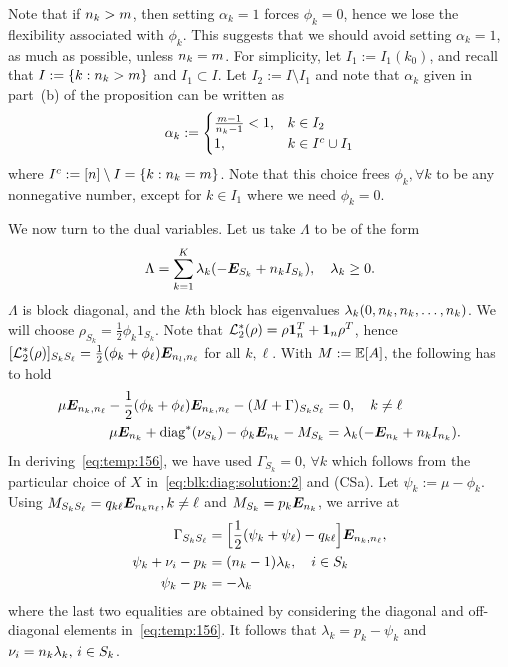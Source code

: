   Note that if $n_k > m$, then setting $\alpha_k = 1$ forces $\phi_k = 0$, hence we lose the flexibility associated with $\phi_k$. This suggests that we should avoid setting $\alpha_k = 1$, as much as possible, unless $n_k = m$. For simplicity, let $I_1 := I_1(k_0)$, and recall that $I := \{ k: n_k > m\}$ and $I_1 \subset I$. Let $I_2 := I \setminus I_1$ and note that $\alpha_k$ given in part~(b) of the proposition can be written as 
  \begin{align*}
    \alpha_k := 
    \begin{cases}
      \frac{m - 1}{n_k-1} < 1, & k \in I_2 \\
      1, & k \in I^c \cup I_1
    \end{cases}
  \end{align*}
where $I^c := [n] \setminus I = \{k: n_k = m\}$. Note that this choice frees $\phi_k, \forall k$ to be any nonnegative number, except for $k \in I_1$ where we need $\phi_k = 0$.

\medskip
We now turn to the dual variables. Let us take $\Lambda$ to be of the form
\begin{align*}
  \Lambda = \sum_{k=1}^K \lambda_k (-\bm{E}_{S_k} + n_k I_{S_k}), \quad \lambda_k \ge 0.
\end{align*}
$\Lambda$ is block diagonal, and the $k$th block has eigenvalues $\lambda_k (0,n_k,n_k,\dots,n_k)$. We will choose $\rho_{S_k} = \frac12 \phi_k 1_{S_k}$. 
%
Note that $\mathcal{L}^*_2(\rho) = \rho \bm{1}_n^T + \bm{1}_n \rho^T$, hence $[\mathcal{L}^*_2(\rho)]_{S_k S_\ell} = \frac12 (\phi_k + \phi_\ell) \bm{E}_{n_l,n_\ell}$ for all $k,\ell$. With $M:= \mathbb{E}[A]$, the following has to hold
\begin{align}
  \mu \bm{E}_{n_k,n_\ell} -  \frac12 (\phi_k + \phi_\ell) \bm{E}_{n_k,n_\ell} - (M+\Gamma)_{S_k S_\ell} &
    = 0, \quad k \neq \ell \notag \\
  \mu \bm{E}_{n_k} + \operatorname{diag}^*(\nu_{S_k}) - \phi_k \bm{E}_{n_k} - M_{S_k} &= \lambda_k (-\bm{E}_{n_k} + n_k I_{n_k}).
  \label{eq:temp:156}
\end{align}
In deriving~\eqref{eq:temp:156}, we have used $\Gamma_{S_k} = 0, \, \forall k$ which follows from the particular choice of $X$ in~\eqref{eq:blk:diag:solution:2} and (CSa). 
%
Let $\psi_k := \mu - \phi_k$. Using $M_{S_k S_\ell} = q_{k\ell} \bm{E}_{n_k n_\ell}, k \neq \ell$ and $M_{S_k} = p_k \bm{E}_{n_k} $, we arrive at
\begin{align*}
  \Gamma_{S_k S_\ell} &= \Big[\frac12(\psi_k + \psi_\ell) - q_{k\ell} \Big] \bm{E}_{n_k,n_\ell}, \\
  \psi_k + \nu_i  - p_k &= (n_k - 1)\lambda_k, \quad i \in S_k \\
  \psi_k - p_k &= - \lambda_k
\end{align*}
where the last two equalities are obtained by considering the diagonal and off-diagonal elements in~\eqref{eq:temp:156}. It follows that $\lambda_k = p_k - \psi_k$ and $\nu_i = n_k \lambda_k, \, i \in S_k$.

